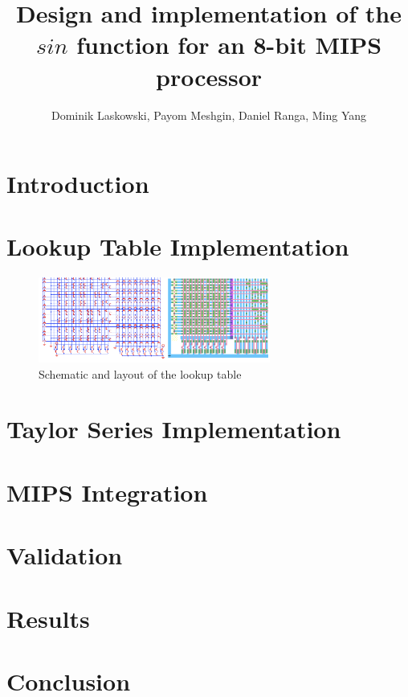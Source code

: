 \documentclass[10pt,journal]{IEEEtran}
\title{Design and implementation of the $sin$ function for an 8-bit MIPS processor}
\author{Dominik Laskowski, Payom Meshgin, Daniel Ranga, Ming Yang}
\begin{document}
\maketitle

\section{Introduction}

\section{Lookup Table Implementation}

\begin{figure}[h]
\centering
\includegraphics[width=3in]{lut.png}
\caption{Schematic and layout of the lookup table}
\label{lut}
\end{figure}

\section{Taylor Series Implementation}

\section{MIPS Integration}

\section{Validation}

\section{Results}

\section{Conclusion}
\end{document}
